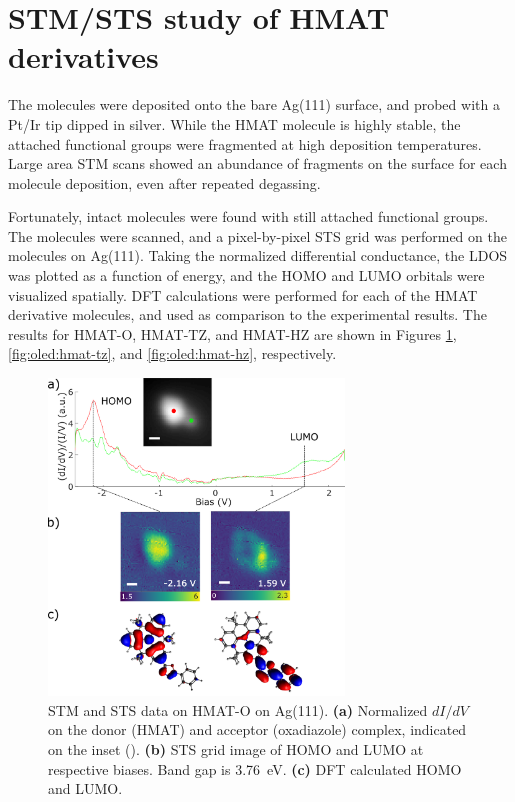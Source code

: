\section{{STM}/{STS} study of HMAT derivatives}

The molecules were deposited onto the bare Ag(111) surface, and probed with a Pt/Ir tip dipped in silver. While the \ac{HMAT} molecule is highly stable, the attached functional groups were fragmented at high deposition temperatures. Large area \ac{STM} scans showed an abundance of fragments on the surface for each molecule deposition, even after repeated degassing.

Fortunately, intact molecules were found with still attached functional groups. The molecules were scanned, and a pixel-by-pixel \ac{STS} grid was performed on the molecules on Ag(111). Taking the normalized differential conductance, the \ac{LDOS} was plotted as a function of energy, and the \ac{HOMO} and \ac{LUMO} orbitals were visualized spatially. \ac{DFT} calculations were performed for each of the \ac{HMAT} derivative molecules, and used as comparison to the experimental results. The results for HMAT-O, HMAT-TZ, and HMAT-HZ are shown in Figures \ref{fig:oled:hmat-o}, \ref{fig:oled:hmat-tz}, and \ref{fig:oled:hmat-hz}, respectively. 

\begin{figure} [H]
    \centering
    \includegraphics[width=0.7\textwidth]{pictures/HMATO_diagram.png}
    \caption{ STM and STS data on HMAT-O on Ag(111). \textbf{(a)} Normalized $dI/dV$ on the donor (HMAT) and acceptor (oxadiazole) complex, indicated on the inset (). \textbf{(b)} STS grid image of HOMO and LUMO at respective biases. Band gap is \SI{3.76}{eV}. \textbf{(c)} DFT calculated HOMO and LUMO. } %
    \label{fig:oled:hmat-o}
\end{figure}

